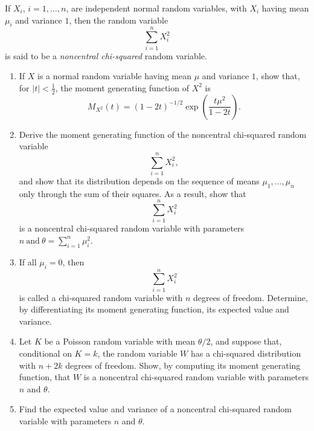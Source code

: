 \begin{exercise}
\label{ex:conditioning-expectation-42}
If $X_i$, $i = 1, \ldots, n$, are independent normal random variables, with $X_i$ having mean $\mu_i$ and variance $1$, then the random variable
\[
\sum_{i=1}^{n} X_i^2
\]
is said to be a \emph{noncentral chi-squared} random variable.

\begin{enumerate}
    \item[(a)] If $X$ is a normal random variable having mean $\mu$ and variance $1$, show that, for $|t|<\frac12$, the moment generating function of $X^2$ is
    \[
    M_{X^2}(t)
    =
    (1-2t)^{-1/2}
    \exp\!\left(\frac{t\mu^2}{1-2t}\right).
    \]

    \item[(b)] Derive the moment generating function of the noncentral chi-squared random variable
    \[
    \sum_{i=1}^{n} X_i^2,
    \]
    and show that its distribution depends on the sequence of means $\mu_1,\ldots,\mu_n$ only through the sum of their squares. As a result, show that
    \[
    \sum_{i=1}^{n} X_i^2
    \]
    is a noncentral chi-squared random variable with parameters $
    n
    ~\text{and}~
    \theta=\sum_{i=1}^{n}\mu_i^2.$

    \item[(c)] If all $\mu_i=0$, then
    \[
    \sum_{i=1}^{n} X_i^2
    \]
    is called a chi-squared random variable with $n$ degrees of freedom. Determine, by differentiating its moment generating function, its expected value and variance.

    \item[(d)] Let $K$ be a Poisson random variable with mean $\theta/2$, and suppose that, conditional on $K=k$, the random variable $W$ has a chi-squared distribution with $n+2k$ degrees of freedom. Show, by computing its moment generating function, that $W$ is a noncentral chi-squared random variable with parameters $n$ and $\theta$.

    \item[(e)] Find the expected value and variance of a noncentral chi-squared random variable with parameters $n$ and $\theta$.
\end{enumerate}
\end{exercise}

